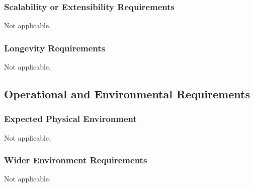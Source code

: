 \documentclass[12pt]{article}
\begin{document}
  \subsubsection{Scalability or Extensibility Requirements}
  Not applicable.

  \subsubsection{Longevity Requirements}
  Not applicable.

  \subsection{Operational and Environmental Requirements}
  \subsubsection{Expected Physical Environment}
  Not applicable.

  \subsubsection{Wider Environment Requirements}
  Not applicable.
\end{document}
